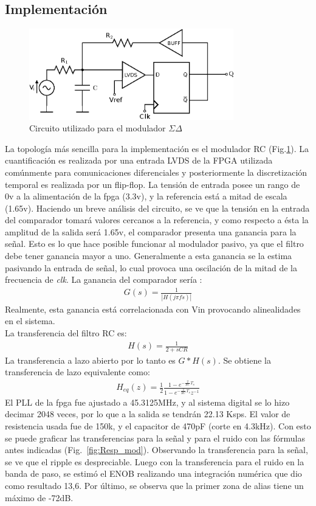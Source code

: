 \documentclass[a4paper,conference]{IEEEtran}
\begin{document}
\subsection{Implementaci\'on}

\begin{figure}[!t]
\centering
\includegraphics[width=3.5in]{Sigma-Delta_RC}
\caption{Circuito utilizado para el modulador $\Sigma\Delta$}
\label{fig_SDRC}
\end{figure}

La topolog\'ia m\'as sencilla para la implementaci\'on es el modulador RC (Fig.\ref{fig_SDRC}). La cuantificaci\'on es realizada por una entrada LVDS de la FPGA\cite{Sp6-IO} utilizada com\'unmente para comunicaciones diferenciales y posteriormente la discretizaci\'on temporal es realizada por un flip-flop. La tensi\'on de entrada posee un rango de 0v a la alimentación de la fpga (3.3v), y la referencia está a mitad de escala (1.65v).  Haciendo un breve an\'alisis del circuito, se ve que la tensi\'on en la entrada del comparador tomar\'a valores cercanos a la referencia, y como respecto a \'esta la amplitud de la salida ser\'a 1.65v, el comparador presenta una ganancia para la se\~nal. Esto es lo que hace posible funcionar al modulador pasivo, ya que el filtro debe tener ganancia mayor a uno. Generalmente a esta ganancia se la estima pasivando la entrada de señal, lo cual provoca una oscilación de la mitad de la frecuencia de \textit{clk}. La ganancia del comparador ser\'ia :
\begin{align}
G(s)=\frac{1}{|H(j\pi fs)|}
\end{align}
Realmente, esta ganancia está correlacionada con Vin provocando alinealidades en el sistema.\\
La transferencia del filtro RC es:
\begin{align}
H(s)=\frac{1}{2+sCR}
\end{align}
La transferencia a lazo abierto por lo tanto es $G*H(s)$. 
Se obtiene la transferencia de lazo equivalente como:
\begin{align}
H_{eq}(z)=\frac{1}{2}\frac{1-e^{-\frac{2}{RC}T_s}}{1-e^{-\frac{2}{RC}T_s}z^{-1}}
\end{align}
El PLL de la fpga fue ajustado a 45.3125MHz, y al sistema digital se lo hizo decimar 2048 veces, por lo que a la salida se tendrán 22.13 Ksps. El valor de resistencia usada fue de 150k, y el capacitor de 470pF (corte en 4.3kHz).
Con esto se puede graficar las transferencias para la señal y para el ruido con las fórmulas antes indicadas (Fig.~\ref{fig:Resp_mod}). Observando la transferencia para la señal, se ve que el ripple es despreciable. Luego con la transferencia para el ruido en la banda de paso, se estimó el ENOB realizando una integraci\'on num\'erica que dio como resultado 13,6. Por último, se observa que la primer zona de alias tiene un m\'aximo de -72dB.
\end{document}
